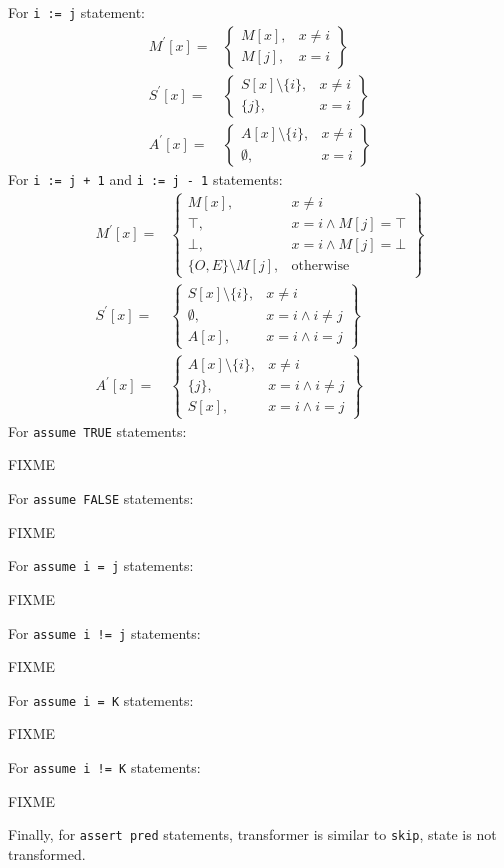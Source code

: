For \texttt{i := j} statement:
\begin{align*}
M^\prime[x] = & \left.
	\begin{cases}
		M[x], & x\ne i \\
		M[j], & x = i
	\end{cases}
\right\}\\
S^\prime[x] = & \left.
	\begin{cases}
		S[x] \setminus \{i\}, & x\ne i \\
		\{j\}, & x = i
	\end{cases}
\right\}\\
A^\prime[x] = & \left.
\begin{cases}
	A[x] \setminus \{i\}, & x\ne i \\
	\emptyset, & x = i
\end{cases}
\right\}
\end{align*}
For \texttt{i := j + 1} and \texttt{i := j - 1} statements:
\begin{align*}
M^\prime[x] = & \left.
	\begin{cases}
		M[x], & x\ne i \\
		\top, & x = i \wedge M[j] = \top \\
		\bot, & x = i \wedge M[j] = \bot \\
		\{O, E\} \setminus M[j], & \text{otherwise}
	\end{cases}
\right\}\\
S^\prime[x] = & \left.
	\begin{cases}
		S[x] \setminus \{i\}, & x\ne i \\
		\emptyset, & x = i \wedge i \ne j \\
		A[x], & x = i \wedge i = j
	\end{cases}
\right\}\\
A^\prime[x] = & \left.
\begin{cases}
	A[x] \setminus \{i\}, & x\ne i \\
	\{j\}, & x = i \wedge i \ne j \\
	S[x], & x = i \wedge i = j
\end{cases}
\right\}
\end{align*}
For \texttt{assume TRUE} statements:

FIXME

For \texttt{assume FALSE} statements:

FIXME

For \texttt{assume i = j} statements:

FIXME

For \texttt{assume i != j} statements:

FIXME

For \texttt{assume i = K} statements:

FIXME

For \texttt{assume i != K} statements:

FIXME

Finally, for \texttt{assert pred} statements, transformer is similar to \texttt{skip}, state is not transformed.